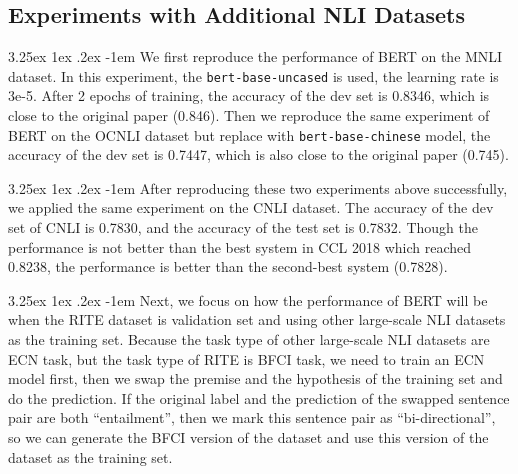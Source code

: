 \documentclass[12pt]{article}
\makeatletter
\renewcommand\paragraph{\@startsection{paragraph}{5}{\z@}%
  {3.25ex \@plus1ex \@minus.2ex}%
  {-1em}%
  {\normalfont\normalsize\bfseries}}
\makeatother
\begin{document}
\begin{CJK*}{UTF8}{bkai}
\begin{spacing}{1.77}
\subsection{Experiments with Additional NLI Datasets}
\paragraph{}
We first reproduce the performance of BERT on the MNLI dataset. In this experiment, the \texttt{bert-base-uncased} is used, the learning rate is 3e-5. After 2 epochs of training, the accuracy of the dev set is 0.8346, which is close to the original paper (0.846). Then we reproduce the same experiment of BERT on the OCNLI dataset but replace with \texttt{bert-base-chinese} model, the accuracy of the dev set is 0.7447, which is also close to the original paper (0.745).

\paragraph{}
After reproducing these two experiments above successfully, we applied the same experiment on the CNLI dataset. The accuracy of the dev set of CNLI is 0.7830, and the accuracy of the test set is 0.7832. Though the performance is not better than the best system in CCL 2018 which reached 0.8238, the performance is better than the second-best system (0.7828).

\paragraph{}
Next, we focus on how the performance of BERT will be when the RITE dataset is validation set and using other large-scale NLI datasets as the training set. Because the task type of other large-scale NLI datasets are ECN task, but the task type of RITE is BFCI task, we need to train an ECN model first, then we swap the premise and the hypothesis of the training set and do the prediction. If the original label and the prediction of the swapped sentence pair are both ``entailment'', then we mark this sentence pair as ``bi-directional'', so we can generate the BFCI version of the dataset and use this version of the dataset as the training set.


\end{spacing}
\end{CJK*}
\end{document}
